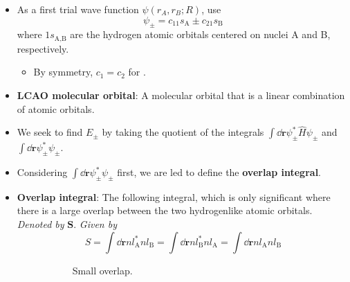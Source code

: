 \documentclass[../notes.tex]{subfiles}
\begin{document}
\begin{itemize}
\begin{itemize}
    \end{itemize}
    \item As a first trial wave function $\psi(r_A,r_B;R)$, use
    \begin{equation*}
        \psi_\pm = c_11s_\text{A}\pm c_21s_\text{B}
    \end{equation*}
    where $1s_\text{A,B}$ are the hydrogen atomic orbitals centered on nuclei A and B, respectively.
    \begin{itemize}
        \item By symmetry, $c_1=c_2$ for .
    \end{itemize}
    \item \textbf{LCAO molecular orbital}: A molecular orbital that is a linear combination of atomic orbitals.
    \item We seek to find $E_\pm$ by taking the quotient of the integrals $\int\dd{\mathbf{r}}\psi_\pm^*\hat{H}\psi_\pm$ and $\int\dd{\mathbf{r}}\psi_\pm^*\psi_\pm$.
    \item Considering $\int\dd{\mathbf{r}}\psi_\pm^*\psi_\pm$ first, we are led to define the \textbf{overlap integral}.
    \item \textbf{Overlap integral}: The following integral, which is only significant where there is a large overlap between the two hydrogenlike atomic orbitals. \emph{Denoted by} $\bm{S}$. \emph{Given by}
    \begin{equation*}
        S = \int\dd{\mathbf{r}}nl_\text{A}^*nl_\text{B}
        = \int\dd{\mathbf{r}}nl_\text{B}^*nl_\text{A}
        = \int\dd{\mathbf{r}}nl_\text{A}nl_\text{B}
    \end{equation*}
    \begin{figure}[h!]
        \centering
        \begin{subfigure}[b]{0.4\linewidth}
            \centering
            \caption{Small overlap.}
            \label{fig:overlapIntegrala}
        \end{subfigure}
        \begin{subfigure}[b]{0.4\linewidth}
            \centering
\end{subfigure}
\end{figure}
\end{itemize}
\end{document}
